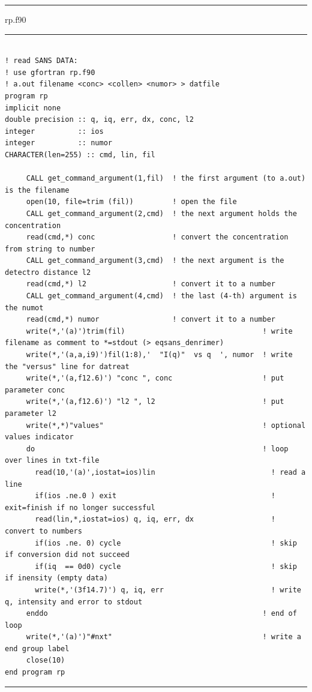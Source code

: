 \documentclass[11pt,fleqn]{book} %
\newcommand{\linespace}{\vspace{4ex}}
\begin{document}
\rule{6cm}{1pt} rp.f90 \rule{6cm}{1pt} 
%
\tiny
\begin{verbatim}

! read SANS DATA: 
! use gfortran rp.f90
! a.out filename <conc> <collen> <numor> > datfile
program rp
implicit none
double precision :: q, iq, err, dx, conc, l2
integer          :: ios
integer          :: numor
CHARACTER(len=255) :: cmd, lin, fil

     CALL get_command_argument(1,fil)  ! the first argument (to a.out) is the filename
     open(10, file=trim (fil))         ! open the file
     CALL get_command_argument(2,cmd)  ! the next argument holds the concentration
     read(cmd,*) conc                  ! convert the concentration from string to number
     CALL get_command_argument(3,cmd)  ! the next argument is the detectro distance l2
     read(cmd,*) l2                    ! convert it to a number
     CALL get_command_argument(4,cmd)  ! the last (4-th) argument is the numot
     read(cmd,*) numor                 ! convert it to a number
     write(*,'(a)')trim(fil)                                ! write filename as comment to *=stdout (> eqsans_denrimer)
     write(*,'(a,a,i9)')fil(1:8),'  "I(q)"  vs q  ', numor  ! write the "versus" line for datreat
     write(*,'(a,f12.6)') "conc ", conc                     ! put parameter conc
     write(*,'(a,f12.6)') "l2 ", l2                         ! put parameter l2
     write(*,*)"values"                                     ! optional values indicator
     do                                                     ! loop over lines in txt-file
       read(10,'(a)',iostat=ios)lin                           ! read a line
       if(ios .ne.0 ) exit                                    ! exit=finish if no longer successful
       read(lin,*,iostat=ios) q, iq, err, dx                  ! convert to numbers
       if(ios .ne. 0) cycle                                   ! skip if conversion did not succeed
       if(iq  == 0d0) cycle                                   ! skip if inensity (empty data)
       write(*,'(3f14.7)') q, iq, err                         ! write q, intensity and error to stdout
     enddo                                                  ! end of loop
     write(*,'(a)')"#nxt"                                   ! write a end group label 
     close(10)
end program rp 
\end{verbatim}
\normalsize
%
\rule{12cm+}{1pt}

\linespace
\end{document}
